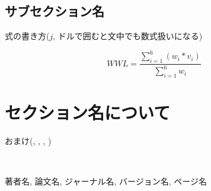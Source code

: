 \documentclass[11pt, a4paper]{jarticle}
\begin{document}
	\subsection{サブセクション名}
		式の書き方($j$, ドルで囲むと文中でも数式扱いになる)

		\begin{equation}
			WWL = \frac{\sum_{i=1}^{6}(w_{i}*v_{i})} {\sum_{i=1}^{6}w_{i}}
		\end{equation}

\section{セクション名について} %
	おまけ(\alpha, \beta, \gamma, \Gamma)

\\


\clearpage

\begin{thebibliography}{99}
 著者名, 論文名, ジャーナル名, バージョン名, ページ名
\end{thebibliography}
\end{document}
